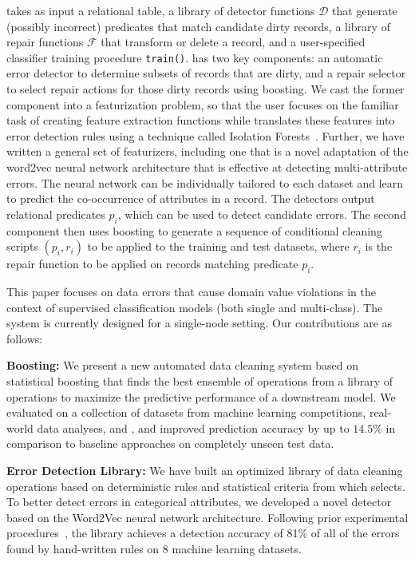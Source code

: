 \sys takes as input a relational table, a library of detector functions $\mathcal{D}$ that generate (possibly incorrect) predicates that match candidate dirty records, a library of repair functions $\mathcal{F}$ that transform or delete a record, and a user-specified classifier training procedure \texttt{train()}.
\sys has two key components: an automatic error detector to determine subsets of records that are dirty, and a repair selector to select repair actions for those dirty records using boosting.
We cast the former component into a featurization problem, so that the user focuses on the familiar task of creating feature extraction functions while \sys translates these features into error detection rules using a technique called Isolation Forests~\cite{liu2008isolation}.  Further, we have written a general set of featurizers, including one that is a novel adaptation of the \textsf{word2vec} neural network architecture that is effective at detecting multi-attribute errors.  The neural network can be individually tailored to each dataset and learn to predict the co-occurrence of attributes in a record. 
The detectors output relational predicates $p_i$, which can be used to detect candidate errors.  The second component then uses boosting to generate a sequence of conditional cleaning scripts $(p_i, r_i)$ to be applied to the training and test datasets, where $r_i$ is the repair function to be applied on records matching predicate $p_i$.

This paper focuses on data errors that cause domain value violations in the context of supervised classification models (both single and multi-class).  The system is currently designed for a single-node setting. Our contributions are as follows:

\vspace{0.25em}\noindent\textbf{Boosting: } We present a new automated data cleaning system based on statistical boosting that finds the best ensemble of operations from a library of operations to maximize the predictive performance of a downstream model. We evaluated \sys on a collection of datasets from machine learning competitions, real-world data analyses, and \company, and improved prediction accuracy by up to $14.5\%$ in comparison to baseline approaches on completely unseen test data. 

\vspace{0.5em}\noindent\textbf{Error Detection Library: } We have built an optimized library of data cleaning operations based on deterministic rules and statistical criteria from which \sys selects. To better detect errors in categorical attributes, we developed a novel detector based on the \textsf{Word2Vec} neural network architecture. Following prior experimental procedures~\cite{DBLP:journals/pvldb/AbedjanCDFIOPST16}, the library achieves a detection accuracy of 81\% of all of the errors found by hand-written rules on 8 machine learning datasets.  %

